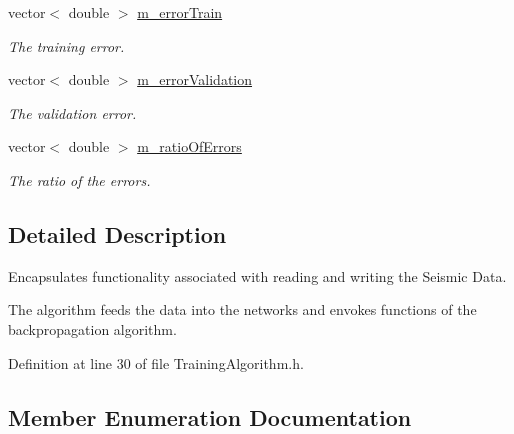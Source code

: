 \begin{DoxyCompactItemize}
vector$<$ double $>$ \hyperlink{classTrainingAlgorithm_a4e1bc94ebf1991d93123ef7ac6d76dd3}{m\+\_\+error\+Train}
\begin{DoxyCompactList}\small\item\em The training error. \end{DoxyCompactList}\item 
vector$<$ double $>$ \hyperlink{classTrainingAlgorithm_abb9b3684f519dc1e262921b9ea4e5c95}{m\+\_\+error\+Validation}
\begin{DoxyCompactList}\small\item\em The validation error. \end{DoxyCompactList}\item 
vector$<$ double $>$ \hyperlink{classTrainingAlgorithm_aefb64ecb3d81de7dacab09cb5e1e2be3}{m\+\_\+ratio\+Of\+Errors}
\begin{DoxyCompactList}\small\item\em The ratio of the errors. \end{DoxyCompactList}\end{DoxyCompactItemize}


\subsection{Detailed Description}
Encapsulates functionality associated with reading and writing the Seismic Data. 

The algorithm feeds the data into the networks and envokes functions of the backpropagation algorithm. 

Definition at line 30 of file Training\+Algorithm.\+h.



\subsection{Member Enumeration Documentation}
